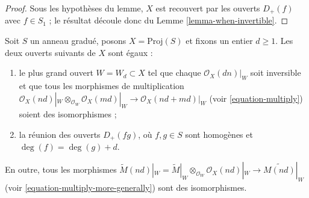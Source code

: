 \begin{proof}
Sous les hypothèses du lemme, $X$ est recouvert par les ouverts
$D_{+}(f)$ avec $f \in S_1$ ; le résultat découle donc du
Lemme \ref{lemma-when-invertible}.
\end{proof}

\begin{lemma}
\label{lemma-where-invertible}
Soit $S$ un anneau gradué, posons $X = \text{Proj}(S)$ et fixons un entier
$d \geq 1$. Les deux ouverts suivants de $X$ sont égaux :
\begin{enumerate}
\item le plus grand ouvert $W = W_d \subset X$ tel que chaque
$\mathcal{O}_X(dn)|_W$ soit inversible et que tous les morphismes de
multiplication
$\mathcal{O}_X(nd)|_W \otimes_{\mathcal{O}_W} \mathcal{O}_X(md)|_W
\to \mathcal{O}_X(nd + md)|_W$
(voir \ref{equation-multiply}) soient des isomorphismes ;
\item la réunion des ouverts $D_{+}(fg)$, où $f, g \in S$ sont homogènes et
$\deg(f) = \deg(g) + d$.
\end{enumerate}
En outre, tous les morphismes
$\widetilde M(nd)|_W = \widetilde M|_W \otimes_{\mathcal{O}_W}
\mathcal{O}_X(nd)|_W \to \widetilde{M(nd)}|_W$
(voir \ref{equation-multiply-more-generally}) sont des isomorphismes.
\end{lemma}

